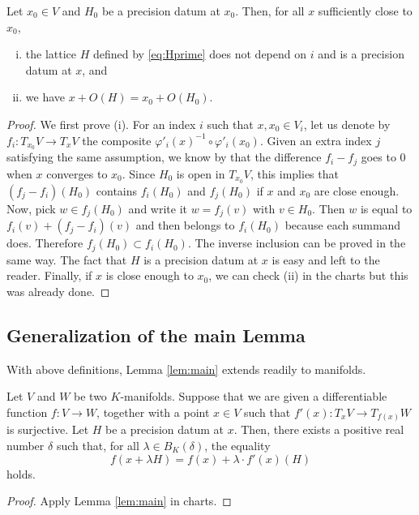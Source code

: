 \documentclass{lms}
\begin{document}
\begin{prop}
Let $x_0 \in V$ and $H_0$ be a precision datum at $x_0$.
Then, for all $x$ sufficiently close to $x_0$,
\begin{enumerate}[(i)]
\item the lattice $H$ defined by \eqref{eq:Hprime} does not depend 
on $i$ and is a precision datum at $x$, and
\item we have $x + O(H) = x_0 + O(H_0)$.
\end{enumerate}
\end{prop}

\begin{proof}
We first prove (i). For an index $i$ such that $x, x_0 \in V_i$, let us 
denote by $f_i : T_{x_0} V \to T_x V$ the composite $\varphi'_i(x)^{-1} 
\circ \varphi'_i(x_0)$. Given an extra index $j$ satisfying the same
assumption, we know by  that the difference
$f_i - f_j$ goes to $0$ when $x$ converges to $x_0$. Since $H_0$ is open
in $T_{x_0} V$, this implies that $(f_j - f_i)(H_0)$ contains $f_i(H_0)$ and 
$f_j(H_0)$ if $x$ and $x_0$ are close enough. Now, pick $w \in f_j(H_0)$ and 
write it $w = f_j(v)$ with $v \in H_0$. Then $w$ is equal to $f_i(v) + 
(f_j - f_i)(v)$ and then belongs to $f_i(H_0)$ because each summand does. 
Therefore $f_j(H_0) \subset f_i(H_0)$. The inverse inclusion can be proved 
in the same way. The fact that $H$ is a precision datum at $x$ is easy
and left to the reader.
Finally, if $x$ is close enough to $x_0$, we can check (ii) in the 
charts but this was already done.
\end{proof}

\subsection{Generalization of the main Lemma}

With above definitions, Lemma \ref{lem:main} extends readily to 
manifolds.

\begin{lem}
Let $V$ and $W$ be two $K$-manifolds. 
Suppose that we are given a differentiable function $f : V \to W$, 
together with a point $x \in V$ such that $f'(x) : T_x V \to T_{f(x)} W$ 
is surjective. Let $H$ be a precision datum at $x$. Then, there exists
a positive real number $\delta$ such that, for all $\lambda \in 
B_K(\delta)$, the equality
$$f(x + \lambda H) = f(x) + \lambda \cdot f'(x)(H)$$
holds.
\end{lem}

\begin{proof}
Apply Lemma \ref{lem:main} in charts.
\end{proof}
\end{document}
